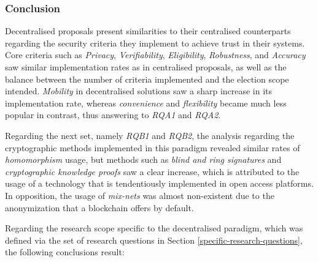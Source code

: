 \documentclass[../access.tex]{subfiles}
\begin{document}
\subsubsection{Conclusion}
Decentralised proposals present similarities to their centralised counterparts regarding the security criteria they implement to achieve trust in their systems. Core criteria such as \textit{Privacy}, \textit{Verifiability}, \textit{Eligibility}, \textit{Robustness}, and \textit{Accuracy} saw similar implementation rates as in centralised proposals, as well as the balance between the number of criteria implemented and the election scope intended. \textit{Mobility} in decentralised solutions saw a sharp increase in its implementation rate, whereas \textit{convenience} and \textit{flexibility} became much less popular in contrast, thus answering to \emph{RQA1} and \emph{RQA2}.
\par
Regarding the next set, namely \emph{RQB1} and \emph{RQB2}, the analysis regarding the cryptographic methods implemented in this paradigm revealed similar rates of \textit{homomorphism} usage, but methods such as \textit{blind and ring signatures} and \textit{cryptographic knowledge proofs} saw a clear increase, which is attributed to the usage of a technology that is tendentiously implemented in open access platforms. In opposition, the usage of \textit{mix-nets} was almost non-existent due to the anonymization that a blockchain offers by default.
\par
Regarding the research scope specific to the decentralised paradigm, which was defined via the set of research questions in Section \ref{specific-research-questions}, the following conclusions result:
\end{document}
